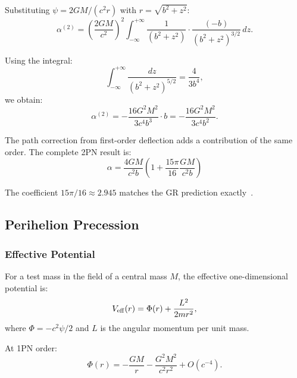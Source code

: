 Substituting $\psi = 2GM/(c^2 r)$ with $r = \sqrt{b^2 + z^2}$:
\begin{equation}
\alpha^{(2)} = \left(\frac{2GM}{c^2}\right)^2 \int_{-\infty}^{+\infty} 
\frac{1}{(b^2+z^2)} \cdot \frac{(-b)}{(b^2+z^2)^{3/2}}\,dz.
\end{equation}

Using the integral:
\begin{equation}
\int_{-\infty}^{+\infty} \frac{dz}{(b^2+z^2)^{5/2}} = \frac{4}{3b^4},
\end{equation}
we obtain:
\begin{equation}
\alpha^{(2)} = -\frac{16G^2M^2}{3c^4 b^3} \cdot b = -\frac{16G^2M^2}{3c^4 b^2}.
\end{equation}

The path correction from first-order deflection adds a contribution of 
the same order. The complete 2PN result is:
\begin{equation}
\boxed{\alpha = \frac{4GM}{c^2 b}\left(1 + \frac{15\pi}{16}\frac{GM}{c^2 b}\right)}
\label{eq:deflection_2pn}
\end{equation}

The coefficient $15\pi/16 \approx 2.945$ matches the GR prediction 
exactly~\cite{Epstein1980,Richter1982}.

\subsection{Perihelion Precession}\label{app:perihelion}

\subsubsection{Effective Potential}

For a test mass in the \DFD field of a central mass $M$, the effective 
one-dimensional potential is:
\begin{equation}
V_{\rm eff}(r) = \Phi(r) + \frac{L^2}{2m r^2},
\end{equation}
where $\Phi = -c^2\psi/2$ and $L$ is the angular momentum per unit mass.

At 1PN order:
\begin{equation}
\Phi(r) = -\frac{GM}{r} - \frac{G^2M^2}{c^2 r^2} + O(c^{-4}).
\end{equation}

